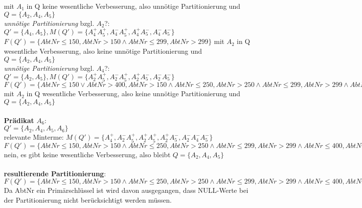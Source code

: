 \documentclass[a4paper]{article}
\begin{document}
mit $ A_1 $ in Q keine wesentliche Verbesserung, also unnötige Partitionierung und $ Q = \{ A_2, A_4, A_5 \} $\\
\textit{unnötige Partitionierung} bzgl. $ A_2 $?: \\
$ Q' = \{A_4, A_5 \}, M(Q') = \{ A_4^+ A_5^+, A_4^- A_5^+, A_4^+ A_5^-, A_4^- A_5^- \} $\\
$ F(Q') = \{ AbtNr\leq 150, AbtNr >150 \wedge AbtNr \leq 299, AbtNr > 299\} $
mit $ A_2 $ in Q wesentliche Verbesserung, also keine unnötige Partitionierung und $ Q = \{ A_2, A_4, A_5 \} $\\
\textit{unnötige Partitionierung} bzgl. $ A_4 $?: \\
$ Q' = \{A_2, A_5 \}, M(Q') = \{ A_2^+ A_5^+, A_2^- A_5^+, A_2^+ A_5^-, A_2^- A_5^- \} $\\
$ F(Q') = \{ AbtNr\leq 150 \vee AbtNr > 400, AbtNr >150 \wedge AbtNr \leq 250, AbtNr>250 \wedge AbtNr \leq 299, AbtNr >299 \wedge AbtNr \leq 400\} $
mit $ A_2 $ in Q wesentliche Verbesserung, also keine unnötige Partitionierung und $ Q = \{ A_2, A_4, A_5 \} $\\
\\
\textbf{Prädikat $ A_6 $}:\\
$ Q' = \{ A_2, A_4, A_5, A_6 \} $\\
relevante Minterme: $ M(Q') = \{ A_4^+, A_2^- A_5^+, A_2^+ A_5^+, A_2^+ A_5^-, A_2^- A_4^- A_5^- \} $\\
$ F(Q') = \{ AbtNr\leq 150, AbtNr >150 \wedge AbtNr \leq 250, AbtNr>250 \wedge AbtNr \leq 299, AbtNr >299 \wedge AbtNr \leq 400, AbtNr > 400 \} $\\
nein, es gibt keine wesentliche Verbesserung, also bleibt $ Q = \{ A_2, A_4, A_5 \} $ \\
\\
\textbf{resultierende Partitionierung}:\\
$ F(Q') = \{ AbtNr\leq 150, AbtNr >150 \wedge AbtNr \leq 250, AbtNr>250 \wedge AbtNr \leq 299, AbtNr >299 \wedge AbtNr \leq 400, AbtNr > 400 \} $\\
Da AbtNr ein Primärschlüssel ist wird davon ausgegangen, dass NULL-Werte bei der Partitionierung nicht berücksichtigt werden müssen. 
\end{document}

